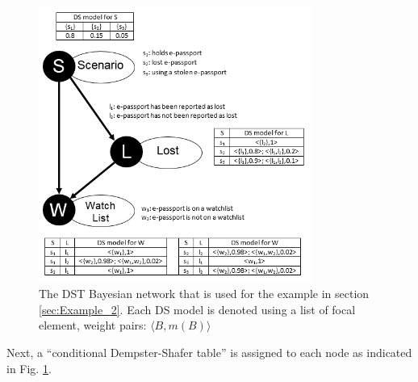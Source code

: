 \documentclass{article}
\begin{document}
\begin{figure}[!hbt]
\begin{center}
\includegraphics[natwidth=572,natheight=530,width=0.8\textwidth]{fig/Belief_network_3.png}
\end{center}
 \caption{The DST Bayesian network that is used for the example in section  \ref{sec:Example_2}. Each DS model is denoted using a list of focal element, weight pairs: $\langle B, m(B)\rangle$}
\label{fig:Belief_network_3}
\end{figure}

Next, a ``conditional Dempster-Shafer table'' is assigned to each node as indicated in Fig. \ref{fig:Belief_network_3}.  
\end{document}
